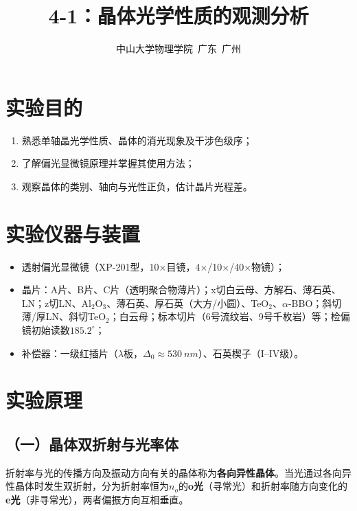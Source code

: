 \documentclass[a4paper,8pt,twocolumn]{article}
\title{
  \textbf{\huge 4-1：晶体光学性质的观测分析}
}
\author{
  \small 中山大学物理学院~广东~广州
}
\begin{document}
\maketitle

\section{实验目的}

\begin{enumerate}
  \item 熟悉单轴晶光学性质、晶体的消光现象及干涉色级序；
  \item 了解偏光显微镜原理并掌握其使用方法；
  \item 观察晶体的类别、轴向与光性正负，估计晶片光程差。
\end{enumerate}

\section{实验仪器与装置}

\begin{itemize}
  \item 透射偏光显微镜（XP-201型，10×目镜，4×/10×/40×物镜）；
  \item 晶片：A片、B片、C片（透明聚合物薄片）；x切白云母、方解石、薄石英、LN；z切LN、Al$_2$O$_3$、薄石英、厚石英（大方/小圆）、TeO$_2$、$\alpha$-BBO；斜切薄/厚LN、斜切TeO$_2$；白云母；标本切片（6号流纹岩、9号千枚岩）等；检偏镜初始读数$185.2^\circ$；
  \item 补偿器：一级红插片（$\lambda$板，$\Delta_0\approx\SI{530}{nm}$）、石英楔子（I--IV级）。
\end{itemize}

\section{实验原理}

\subsection*{（一）晶体双折射与光率体}

折射率与光的传播方向及振动方向有关的晶体称为\textbf{各向异性晶体}。当光通过各向异性晶体时发生双折射，分为折射率恒为$n_o$的\textbf{o光}（寻常光）和折射率随方向变化的\textbf{e光}（非寻常光），两者偏振方向互相垂直。
\end{document}
